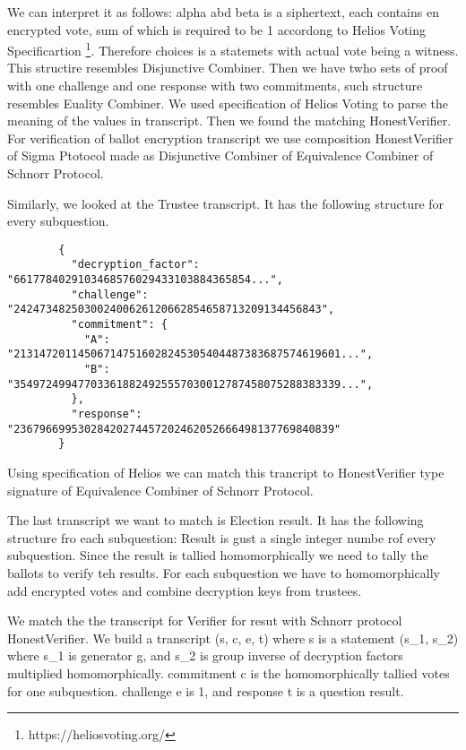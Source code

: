     We can interpret it as follows: alpha abd beta is a siphertext, each contains en encrypted vote, 
    sum of which is required to be 1 accordong to Helios Voting Specificartion \footnote{https://heliosvoting.org/}.
    Therefore choices is a statemets with actual vote being a witness. This structire resembles Disjunctive Combiner. 
    Then we have twho sets of proof with one challenge and one response with two commitments, 
    such structure resembles Euality Combiner. We used specification of Helios Voting to parse the meaning of the 
    values in transcript. Then we found the matching HonestVerifier. For verification of 
    ballot encryption transcript we use composition HonestVerifier of Sigma Ptotocol made as  
    Disjunctive Combiner of Equivalence Combiner of Schnorr Protocol.

    Similarly, we looked at the Trustee transcript. It has the following structure for every subquestion.

    \begin{verbatim}
        {
          "decryption_factor": "6617784029103468576029433103884365854...",
          "challenge": "242473482503002400626120662854658713209134456843",
          "commitment": {
            "A": "213147201145067147516028245305404487383687574619601...",
            "B": "354972499477033618824925557030012787458075288383339...",
          },
          "response": "23679669953028420274457202462052666498137769840839"
        }
        \end{verbatim}
        
    Using specification of Helios we can match this trancript to HonestVerifier type signature of Equivalence Combiner of Schnorr Protocol.
    
    The last transcript we want to match is Election result. It has the following structure fro each subquestion:
    Result is gust a single integer numbe rof every subquestion. Since the result is tallied homomorphically we need 
    to tally the ballots to verify teh results. 
    For each subquestion we have to homomorphically add encrypted votes and combine decryption keys from trustees.
    
    We match the the transcript for Verifier for resut with Schnorr protocol HonestVerifier.
    We build a transcript (s, c, e, t)
    where s is a statement (s_1, s_2)
    where s_1 is generator g, and s_2 is group inverse of decryption factors multiplied homomorphically.
    commitment c is the homomorphically tallied votes for one subquestion.
    challenge e is 1,
    and response t is a question result.
\newpage
